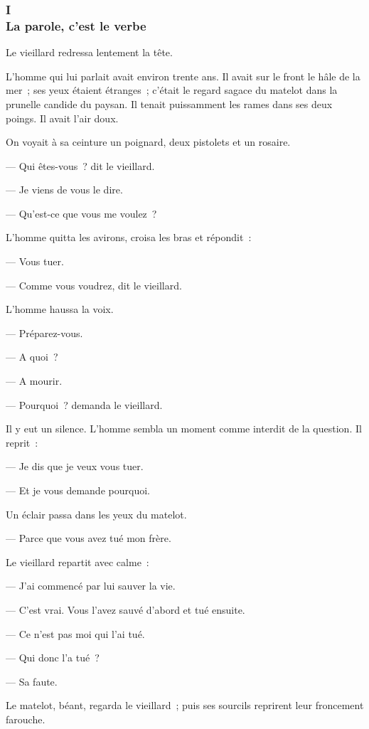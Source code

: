 \documentclass[french,twoside]{book} %
\begin{document}
\subsubsection[{I. La parole, c’est le verbe}]{I \\
La parole, c’est le verbe}
\label{p1l3c1}
\noindent Le vieillard redressa lentement la tête.\par
L’homme qui lui parlait avait environ trente ans. Il avait sur le front le hâle de la mer ; ses yeux étaient étranges ; c’était le regard sagace du matelot dans la prunelle candide du paysan. Il tenait puissamment les rames dans ses deux poings. Il avait l’air doux.\par
On voyait à sa ceinture un poignard, deux pistolets et un rosaire.\par
— Qui êtes-vous ? dit le vieillard.\par
— Je viens de vous le dire.\par
— Qu’est-ce que vous me voulez ?\par
L’homme quitta les avirons, croisa les bras et répondit :\par
 — Vous tuer.\par
— Comme vous voudrez, dit le vieillard.\par
L’homme haussa la voix.\par
— Préparez-vous.\par
— A quoi ?\par
— A mourir.\par
— Pourquoi ? demanda le vieillard.\par
Il y eut un silence. L’homme sembla un moment comme interdit de la question. Il reprit :\par
— Je dis que je veux vous tuer.\par
— Et je vous demande pourquoi.\par
Un éclair passa dans les yeux du matelot.\par
— Parce que vous avez tué mon frère.\par
Le vieillard repartit avec calme :\par
— J’ai commencé par lui sauver la vie.\par
— C’est vrai. Vous l’avez sauvé d’abord et tué ensuite.\par
— Ce n’est pas moi qui l’ai tué.\par
— Qui donc l’a tué ?\par
— Sa faute.\par
Le matelot, béant, regarda le vieillard ; puis ses sourcils reprirent leur froncement farouche.\par
\end{document}
